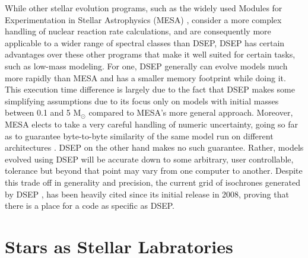 While other stellar evolution programs, such as the widely used Modules for
Experimentation in Stellar Astrophysics (MESA) \citep{Paxton2011}, consider a
more complex handling of nuclear reaction rate calculations, and are
consequently more applicable to a wider range of spectral classes than DSEP,
DSEP has certain advantages over these other programs that make it well suited
for certain tasks, such as low-mass modeling. For one, DSEP generally can
evolve models much more rapidly than MESA and has a smaller memory footprint
while doing it. This execution time difference is largely due to the fact that
DSEP makes some simplifying assumptions due to its focus only on models with
initial masses between 0.1 and 5 M$_{\odot}$ compared to MESA’s more general
approach.  Moreover, MESA elects to take a very careful handling of numeric
uncertainty, going so far as to guarantee byte-to-byte similarity of the same
model run on different architectures \citep{Paxton2011}. DSEP on the other hand
makes no such guarantee. Rather, models evolved using DSEP will be accurate
down to some arbitrary, user controllable, tolerance but beyond that point may
vary from one computer to another. Despite this trade off in generality and
precision, the current grid of isochrones generated by DSEP \citep{Dotter2008},
has been heavily cited since its initial release in 2008, proving that there is
a place for a code as specific as DSEP.


\chapter{Stars as Stellar Labratories}

